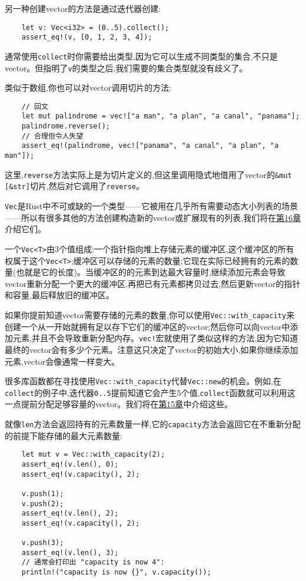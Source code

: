 另一种创建vector的方法是通过迭代器创建:
\begin{verbatim}
    let v: Vec<i32> = (0..5).collect();
    assert_eq!(v, [0, 1, 2, 3, 4]);
\end{verbatim}

通常使用\texttt{collect}时你需要给出类型,因为它可以生成不同类型的集合,不只是vector。但指明了\texttt{v}的类型之后,我们需要的集合类型就没有歧义了。

类似于数组,你也可以对vector调用切片的方法:
\begin{verbatim}
    // 回文
    let mut palindrome = vec!["a man", "a plan", "a canal", "panama"];
    palindrome.reverse();
    // 合理但令人失望
    assert_eq!(palindrome, vec!["panama", "a canal", "a plan", "a man"]);
\end{verbatim}

这里,\texttt{reverse}方法实际上是为切片定义的,但这里调用隐式地借用了vector的\texttt{\&mut [\&str]}切片,然后对它调用了\texttt{reverse}。

\texttt{Vec}是Rust中不可或缺的一个类型——它被用在几乎所有需要动态大小列表的场景——所以有很多其他的方法创建构造新的vector或扩展现有的列表,我们将在\hyperref[ch16]{第16章}介绍它们。

一个\texttt{Vec<T>}由3个值组成:一个指针指向堆上存储元素的缓冲区,这个缓冲区的所有权属于这个\texttt{Vec<T>};缓冲区可以存储的元素的数量;它现在实际已经拥有的元素的数量(也就是它的长度)。当缓冲区的的元素到达最大容量时,继续添加元素会导致vector重新分配一个更大的缓冲区,再把已有元素都拷贝过去,然后更新vector的指针和容量,最后释放旧的缓冲区。

如果你提前知道vector需要存储的元素的数量,你可以使用\texttt{Vec::with\_capacity}来创建一个从一开始就拥有足以存下它们的缓冲区的vector;然后你可以向vector中添加元素,并且不会导致重新分配内存。\texttt{vec!}宏就使用了类似这样的方法,因为它知道最终的vector会有多少个元素。注意这只决定了vector的初始大小,如果你继续添加元素,vector会像通常一样变大。

很多库函数都在寻找使用\texttt{Vec::with\_capacity}代替\texttt{Vec::new}的机会。例如,在\texttt{collect}的例子中,迭代器\texttt{0..5}提前知道它会产生5个值,\texttt{collect}函数就可以利用这一点提前分配足够容量的vector。我们将在\hyperref[ch15]{第15章}中介绍这些。

就像\texttt{len}方法会返回持有的元素数量一样,它的\texttt{capacity}方法会返回它在不重新分配的前提下能存储的最大元素数量:
\begin{verbatim}
    let mut v = Vec::with_capacity(2);
    assert_eq!(v.len(), 0);
    assert_eq!(v.capacity(), 2);

    v.push(1);
    v.push(2);
    assert_eq!(v.len(), 2);
    assert_eq!(v.capacity(), 2);

    v.push(3);
    assert_eq!(v.len(), 3);
    // 通常会打印出 "capacity is now 4":
    println!("capacity is now {}", v.capacity());
\end{verbatim}

